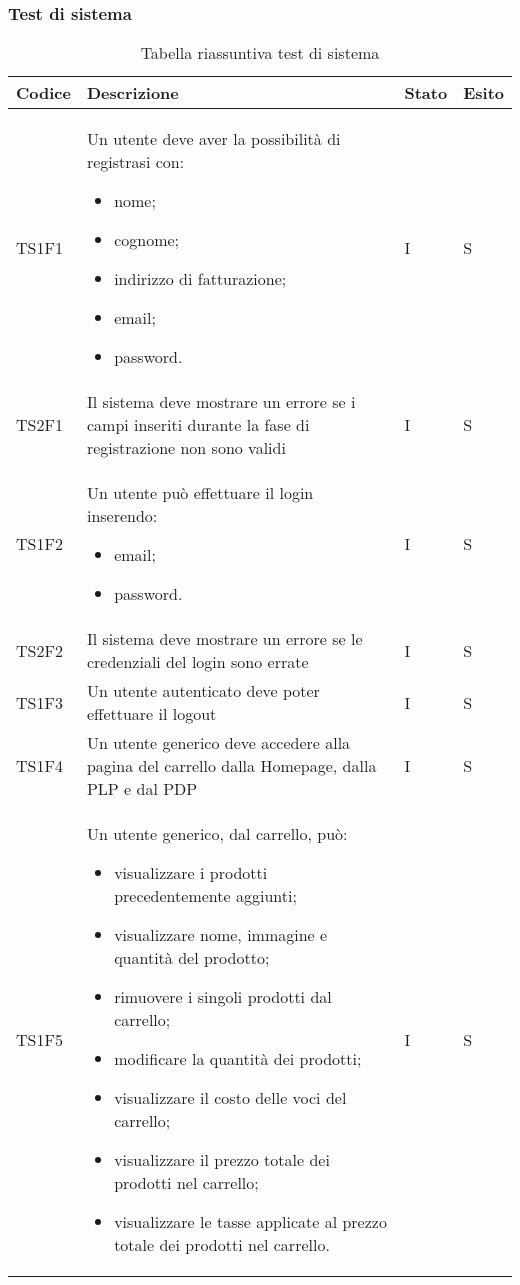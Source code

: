 \subsubsection{Test di sistema}
{

\centering
\renewcommand{\arraystretch}{2}
\begin{longtable}{C{2cm} C{9.6cm} C{1.5cm} C{1cm}}
\caption{Tabella riassuntiva test di sistema}\\
\textbf{Codice} &
\textbf{Descrizione}&
\textbf{Stato}&
\textbf{Esito}\\
\endhead


TS1F1 & Un utente deve aver la possibilità di registrasi con:
\begin{itemize}
	\item nome;
	\item cognome;
	\item indirizzo di fatturazione;
	\item email;
	\item password.
\end{itemize} & I & S\\
TS2F1 & Il sistema deve mostrare un errore se
i campi inseriti durante la fase di registrazione non sono validi & I & S\\
TS1F2 & Un utente può effettuare il login inserendo:
\begin{itemize}
	\item email;
	\item password.
\end{itemize} & I & S\\
TS2F2 & Il sistema deve mostrare un errore se le credenziali del login sono errate & I & S\\
TS1F3 & Un utente autenticato deve poter effettuare il
logout & I & S\\
TS1F4 & Un utente generico deve accedere alla pagina del carrello dalla Homepage, dalla PLP e dal PDP & I & S\\
TS1F5 & Un utente generico, dal carrello, può:
\begin{itemize}
	\item visualizzare i prodotti precedentemente aggiunti;
	\item visualizzare nome, immagine e quantità del prodotto;
	\item rimuovere i singoli prodotti dal carrello;
	\item modificare la quantità dei prodotti;
	\item visualizzare il costo delle voci del carrello;
	\item visualizzare il prezzo totale dei prodotti nel carrello;
	\item visualizzare le tasse applicate al prezzo totale dei prodotti nel carrello.
\end{itemize}
& I & S\\


\end{longtable}}
